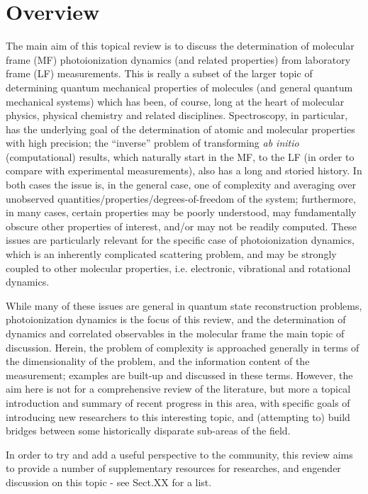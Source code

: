 \section{Overview}
The main aim of this topical review is to discuss the determination of molecular frame (MF) photoionization dynamics (and related properties) from laboratory frame (LF) measurements. This is really a subset of the larger topic of determining quantum mechanical properties of molecules (and general quantum mechanical systems) which has been, of course, long at the heart of molecular physics, physical chemistry and related disciplines. Spectroscopy, in particular, has the underlying goal of the determination of atomic and molecular properties with high precision; the “inverse” problem of transforming \textit{ab initio} (computational) results, which naturally start in the MF, to the LF (in order to compare with experimental measurements), also has a long and storied history. In both cases the issue is, in the general case, one of complexity and averaging over unobserved quantities/properties/degrees-of-freedom of the system; furthermore, in many cases, certain properties may be poorly understood, may fundamentally obscure other properties of interest, and/or may not be readily computed. These issues are particularly relevant for the specific case of photoionization dynamics, which is an inherently complicated scattering problem, and may be strongly coupled to other molecular properties, i.e. electronic, vibrational and rotational dynamics. 

While many of these issues are general in quantum state reconstruction problems, photoionization dynamics is the focus of this review, and the determination of dynamics and correlated observables in the molecular frame the main topic of discussion. Herein, the problem of complexity is approached generally in terms of the dimensionality of the problem, and the information content of the measurement; examples are built-up and discussed in these terms. However, the aim here is not for a comprehensive review of the literature, but more a topical introduction and summary of recent progress in this area, with specific goals of introducing new researchers to this interesting topic, and (attempting to) build bridges between some historically disparate sub-areas of the field.

In order to try and add a useful perspective to the community, this review aims to provide a number of supplementary resources for researches, and engender discussion on this topic - see Sect.XX  for a list.